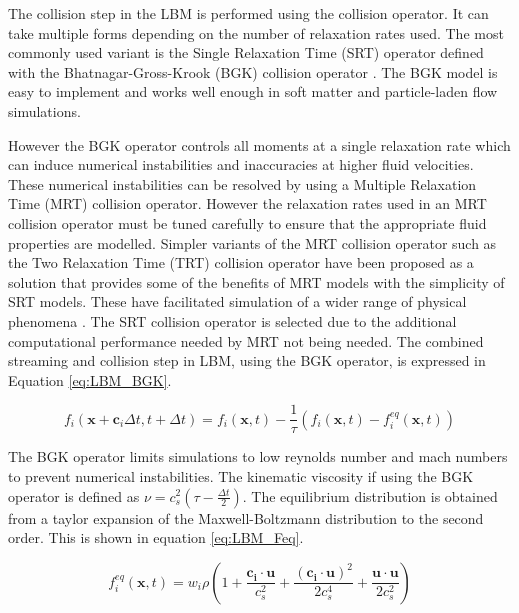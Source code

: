 The collision step in the LBM is performed using the collision operator. It can take multiple forms depending on the number of
relaxation rates used. The most commonly used variant is the Single Relaxation Time (SRT) operator defined with the Bhatnagar-Gross-Krook (BGK) 
collision operator \cite{bhatnagar_model_1954, qian_lattice_1992}. The BGK model is easy to implement and works well enough in soft matter and
particle-laden flow simulations.

However the BGK operator controls all moments at a single relaxation rate which can induce numerical instabilities and inaccuracies
at higher fluid velocities. \cite{liu_simulation_2023, adhikari_fluctuating_2005} These numerical instabilities can be resolved by using
a Multiple Relaxation Time (MRT) collision operator. However the relaxation rates used in an MRT collision operator must be tuned carefully
to ensure that the appropriate fluid properties are modelled. Simpler variants of the MRT collision operator such as the Two Relaxation Time (TRT)
collision operator have been proposed as a solution that provides some of the benefits of MRT models with the simplicity of SRT models. These 
have facilitated simulation of a wider range of physical phenomena \cite{adhikari_fluctuating_2005, liu_simulation_2023}. The SRT collision 
operator is selected due to the additional computational performance needed by MRT not being needed. The combined streaming and 
collision step in LBM, using the BGK operator, is expressed in Equation \ref{eq:LBM_BGK}.

\begin{equation}
    f_{i}(\mathbf{x} + \mathbf{c}_{i}\Delta t, t + \Delta t) = f_{i}(\mathbf{x}, t) - \frac{1}{\tau}(f_{i}(\mathbf{x}, t) 
    - f_{i}^{eq}(\mathbf{x}, t))
    \label{eq:LBM_BGK}
\end{equation}

The BGK operator limits simulations to low reynolds number and mach numbers to prevent numerical instabilities. 
\cite{qian_lattice_1992} The kinematic viscosity if using the BGK operator is defined as 
$\nu = c_s^2(\tau - \frac{\Delta t}{2})$. The equilibrium distribution is obtained from a taylor expansion of the 
Maxwell-Boltzmann distribution to the second order. \cite{he_theory_1997, succi_lattice_2018} This is shown in equation 
\ref{eq:LBM_Feq}.

\begin{equation}
    f_{i}^{eq}(\mathbf{x}, t) = w_i\rho(1 + \frac{\mathbf{c_i} \cdot \mathbf{u}}{c_s^2} + \frac{(\mathbf{c_i} \cdot 
    \mathbf{u})^2}{2c_s^4} + \frac{\mathbf{u} \cdot \mathbf{u}}{2c_s^2})
    \label{eq:LBM_Feq}
\end{equation}

